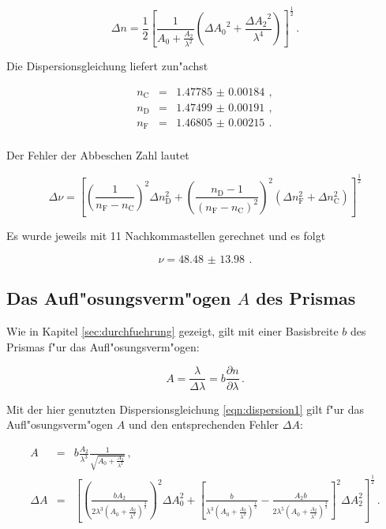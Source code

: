 		\begin{equation*}
			\Delta n = \frac{1}{2}\left[\frac{1}{A_0 + \frac{A_2}{\lambda^2}}\left(\Delta {A_0}^2 + \frac{\Delta {A_2}^2}{\lambda^4}\right)\right]^\frac{1}{2}\,.
		\end{equation*}

		Die Dispersionsgleichung liefert zun"achst

		\begin{eqnarray*}
			n_\mathrm{C} & = & \SI{1.47785(184)}{} \,, \\
			n_\mathrm{D} & = & \SI{1.47499(191)}{} \,, \\
			n_\mathrm{F} & = & \SI{1.46805(215)}{} \,. \\
		\end{eqnarray*}

		Der Fehler der Abbeschen Zahl lautet

		\begin{equation*}
			\Delta \nu = \left[\left(\frac{1}{n_\mathrm{F}-n_\mathrm{C}}\right)^2 \Delta n_\mathrm{D}^2 + \left(\frac{n_\mathrm{D}-1}{(n_\mathrm{F}-n_\mathrm{C})^2}\right)^2\left(\Delta n_\mathrm{F}^2 + \Delta n_\mathrm{C}^2\right) \right]^\frac{1}{2}
		\end{equation*}

		Es wurde jeweils mit 11 Nachkommastellen gerechnet und es folgt

		\begin{equation*}
			\nu = \SI{48.48(1398)}{} \,.
		\end{equation*}

	\subsection{Das Aufl"osungsverm"ogen $A$ des Prismas}
	\label{subsec:aufloesungsvermoegen}
		Wie in Kapitel \ref{sec:durchfuehrung} gezeigt, gilt mit einer Basisbreite $b$ des Prismas f"ur das Aufl"osungsverm"ogen:

		\begin{equation*}
			A = \frac{\lambda}{\Delta \lambda} = b \frac{\partial n}{\partial \lambda} \,.
		\end{equation*}

		Mit der hier genutzten Dispersionsgleichung \eqref{eqn:dispersion1} gilt f"ur das Aufl"osungsverm"ogen $A$ und den entsprechenden Fehler $\Delta A$:

		\begin{eqnarray*}
			A & = & b \frac{A_2}{\lambda^3} \frac{1}{\sqrt{A_0 + \frac{A_2}{\lambda^2}}} \,, \\
			\Delta A & = & \left[\left(\frac{b A_2}{2 \lambda^3 \left( A_0 + \frac{A_2}{\lambda^2} \right)^\frac{3}{2}} \right)^2 \Delta A_0^2 + 
				\left[\frac{b}{\lambda^3 \left(A_0 + \frac{A_2}{\lambda^2}\right)^\frac{1}{2}} - \frac{A_2 b}{2\lambda^5 \left(A_0 + \frac{A_2}{\lambda^2}\right)^\frac{3}{2}}\right]^2 \Delta A_2^2
			\right]^\frac{1}{2} \,.
		\end{eqnarray*}

